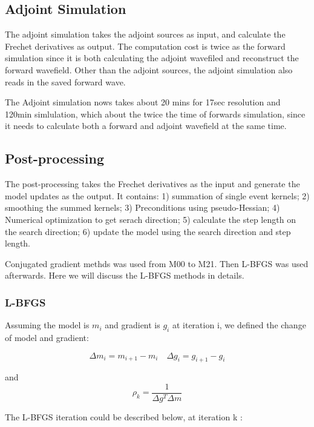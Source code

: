 \documentclass[extra,mreferee]{gji}
\begin{document}
\subsection{Adjoint Simulation}
The adjoint simulation takes the adjoint sources as input, and calculate the Frechet derivatives as output. The computation cost is twice as the forward simulation since it is both calculating the adjoint wavefiled and reconstruct the forward wavefield. Other than the adjoint sources, the adjoint simulation also reads in the saved forward wave.

The Adjoint simulation nows takes about 20 mins for 17sec resolution and 120min simlulation, which about the twice the time of forwards simulation, since it needs to calculate both a forward and adjoint wavefield at the same time.

\subsection{Post-processing}
The post-processing takes the Frechet derivatives as the input and generate the model updates as the output. It contains: 1) summation of single event kernels; 2) smoothing the summed kernels; 3) Preconditions using pseudo-Hessian; 4) Numerical optimization to get serach direction; 5) calculate the step length on the search direction; 6) update the model using the search direction and step length.

Conjugated gradient methds was used from M00 to M21. Then L-BFGS was used afterwards. Here we will discuss the L-BFGS methods in details.

\subsubsection{L-BFGS}

Assuming the model is $m_i$ and gradient is $g_i$ at iteration i, we
defined the change of model and gradient:

\begin{equation*}
    \Delta m_i = m_{i+1} - m_i \quad
    \Delta g_i = g_{i+1} - g_i
\end{equation*}

and
\begin{equation*}
     \rho_k = \frac{1}{\Delta g^{T} \Delta m}
\end{equation*}

The L-BFGS iteration could be described below, at iteration k \citep{wright1999numerical}:
\end{document}
